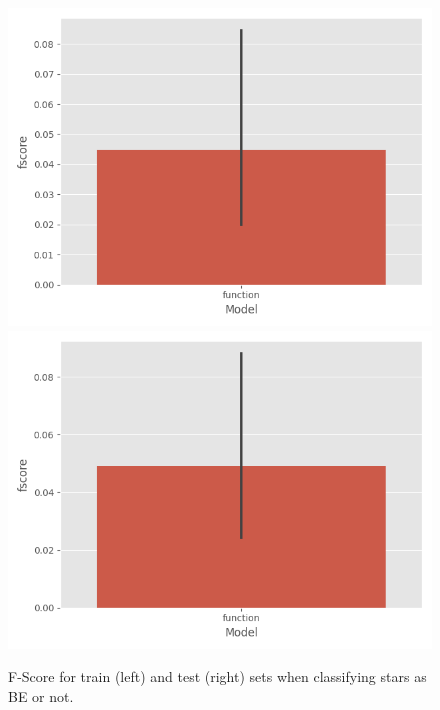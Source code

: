 \documentclass{article}
\begin{document}
\begin{figure}
    \includegraphics[width=0.49\linewidth]{plots/SKLearnClassifiers/aidelman_be_train_fscore.png}
    \includegraphics[width=0.49\linewidth]{plots/SKLearnClassifiers/aidelman_be_test_fscore.png}
    \caption{F-Score for train (left) and test (right) sets when classifying stars as BE or not.}
\end{figure}
\end{document}
